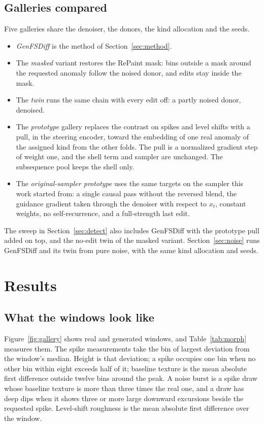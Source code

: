 \documentclass[11pt,a4paper]{article}
\begin{document}
\subsection{Galleries compared}
\label{sec:ablations}

Five galleries share the denoiser, the donors, the kind allocation and the
seeds.
\begin{itemize}
\setlength{\itemsep}{1pt}
\item \emph{GenFSDiff} is the method of Section~\ref{sec:method}.
\item The \emph{masked} variant restores the RePaint mask: bins outside a mask
  around the requested anomaly follow the noised donor, and edits stay inside
  the mask.
\item The \emph{twin} runs the same chain with every edit off: a partly noised
  donor, denoised.
\item The \emph{prototype} gallery replaces the contrast on spikes and level
  shifts with a pull, in the steering encoder, toward the embedding of one real
  anomaly of the assigned kind from the other folds. The pull is a normalized
  gradient step of weight one, and the shell term and sampler are unchanged.
  The subsequence pool keeps the shell only.
\item The \emph{original-sampler prototype} uses the same targets on the
  sampler this work started from: a single causal pass without the reversed
  blend, the guidance gradient taken through the denoiser with respect to
  $x_{t}$, constant weights, no self-recurrence, and a full-strength last edit.
\end{itemize}
The sweep in Section~\ref{sec:detect} also includes GenFSDiff with the
prototype pull added on top, and the no-edit twin of the masked variant.
Section~\ref{sec:noise} runs GenFSDiff and its twin from pure noise, with the
same kind allocation and seeds.

\section{Results}
\label{sec:results}

\subsection{What the windows look like}
\label{sec:morph}

Figure~\ref{fig:gallery} shows real and generated windows, and
Table~\ref{tab:morph} measures them. The spike measurements take the bin of
largest deviation from the window's median. Height is that deviation; a spike
occupies one bin when no other bin within eight exceeds half of it; baseline
texture is the mean absolute first difference outside twelve bins around the
peak. A noise burst is a spike draw whose baseline texture is more than three
times the real one, and a draw has deep dips when it shows three or more large
downward excursions beside the requested spike. Level-shift roughness is the
mean absolute first difference over the window.
\end{document}
